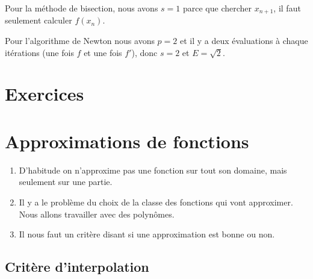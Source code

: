 \begin{example}[Bisection]
    Pour la méthode de bisection, nous avons \( s=1\) parce que chercher \( x_{n+1}\), il faut seulement calculer \( f(x_n)\).
\end{example}

\begin{example}[Newton]
    Pour l'algorithme de Newton nous avons \( p=2\) et il y a deux évaluations à chaque itérations (une fois \( f\) et une fois \( f'\)), donc \( s=2\) et \( E=\sqrt{ 2 }\).
\end{example}

\section{Exercices}


\section{Approximations de fonctions}

\begin{enumerate}
    \item
        D'habitude on n'approxime pas une fonction sur tout son domaine, mais seulement sur une partie.
    \item
        Il y a le problème du choix de la classe des fonctions qui vont approximer. Nous allons travailler avec des polynômes.
    \item
        Il nous faut un critère disant si une approximation est bonne ou non.
\end{enumerate}

\subsection{Critère d'interpolation}

